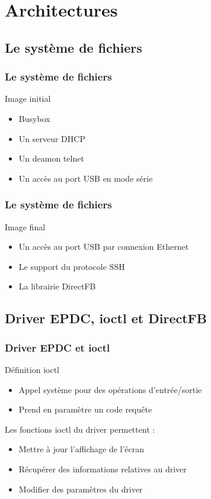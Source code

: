 \section{Architectures}
\subsection{Le système de fichiers}
\begin{frame}
\frametitle{Le système de fichiers}

\begin{block}{Image initial}
\begin{itemize}
\item Busybox
\item Un serveur DHCP
\item Un deamon telnet
\item Un accès au port USB en mode série 
\end{itemize}
\end{block}
\end{frame}

\begin{frame}
\frametitle{Le système de fichiers}
\begin{block}{Image final}
\begin{itemize}
\item Un accès au port USB par connexion Ethernet
\item Le support du protocole SSH
\item La librairie DirectFB
\end{itemize}
\end{block}

\end{frame}

\subsection{Driver EPDC, ioctl et DirectFB}

\begin{frame}
\frametitle{Driver EPDC et ioctl}

\begin{block}{Définition ioctl}
\begin{itemize}
\item Appel système pour des opérations d'entrée/sortie
\item Prend en paramètre un code requête
\end{itemize}
\end{block}
\begin{block}{Les fonctions ioctl du driver permettent :}
\begin{itemize}
\item Mettre à jour l'affichage de l'écran
\item Récupérer des informations relatives au driver
\item Modifier des paramètres du driver
\end{itemize}
\end{block}

\end{frame}

